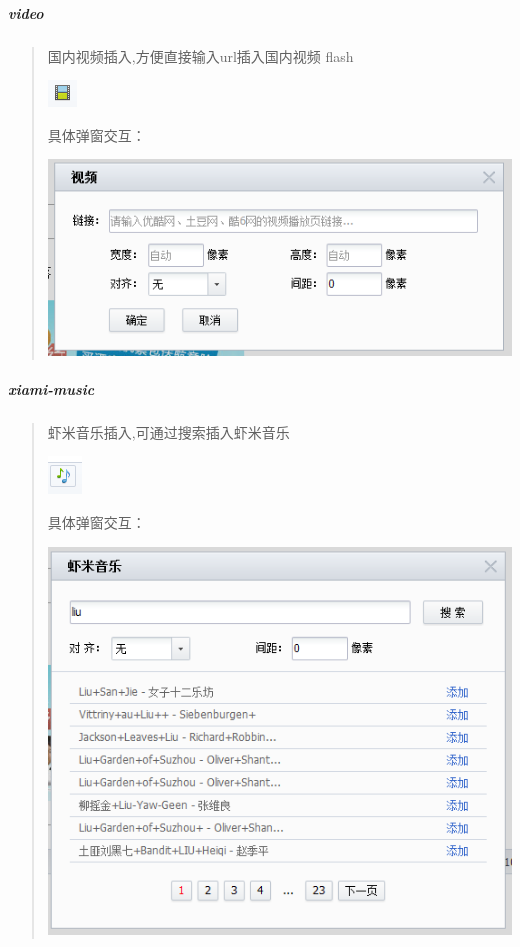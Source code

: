 \documentclass[letterpaper,10pt,english]{sphinxmanual}
\begin{document}
\subparagraph{video}
\label{relatedproj/editorguide/plugin:video}\begin{quote}

国内视频插入,方便直接输入url插入国内视频 flash

\includegraphics{video1.png}

具体弹窗交互：

\includegraphics{video_win1.png}
\end{quote}


\subparagraph{xiami-music}
\label{relatedproj/editorguide/plugin:xiami-music}\begin{quote}

虾米音乐插入,可通过搜索插入虾米音乐

\includegraphics{xiami1.png}

具体弹窗交互：

\includegraphics{xiami_win1.png}
\end{quote}
\end{document}
